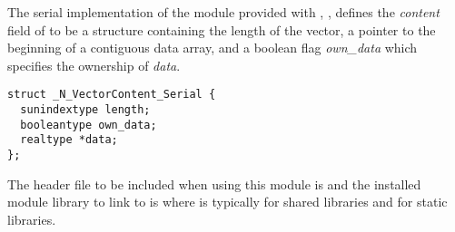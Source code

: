 
The serial implementation of the {\nvector} module provided with {\sundials},
{\nvecs}, defines the {\em content} field of  to be a structure 
containing the length of the vector, a pointer to the beginning of a contiguous 
data array, and a boolean flag {\em own\_data} which specifies the ownership 
of {\em data}.
\begin{verbatim} 
struct _N_VectorContent_Serial {
  sunindextype length;
  booleantype own_data;
  realtype *data;
};
\end{verbatim}

The header file to be included when using this module is 
and the installed module library to link to is
where  is typically  for shared libraries and 
for static libraries.

